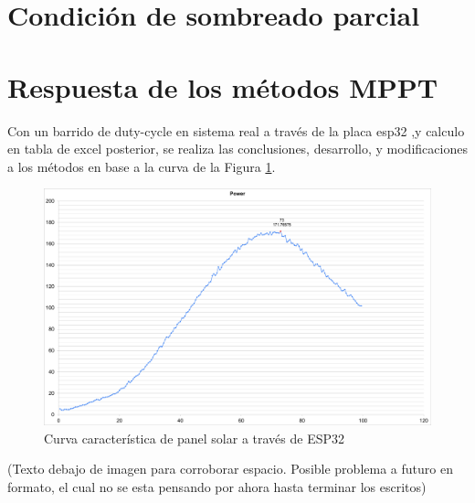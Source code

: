 \section{Condición de sombreado parcial}
\section{Respuesta de los métodos MPPT}
Con un barrido de duty-cycle en sistema real a través de la placa esp32 ,y calculo en tabla de excel posterior, se realiza las conclusiones, desarrollo, y modificaciones a los métodos en base a la curva de la Figura \ref{fig:curva_panel_esp32}.
\begin{figure}[H]
    \centering
    \includegraphics[width=1\linewidth]{imagenes/curva_panel_solar_por_esp32.png}
    \caption{Curva característica de panel solar a través de ESP32}
    \label{fig:curva_panel_esp32}
\end{figure}
(Texto debajo de imagen para corroborar espacio. Posible problema a futuro en formato, el cual no se esta pensando por ahora hasta terminar los escritos)
